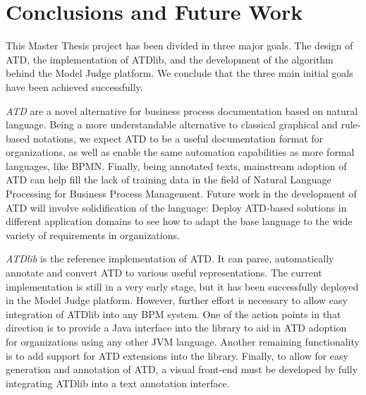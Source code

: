 \chapter{Conclusions and Future Work}
\label{cha:conclusions}

This Master Thesis project has been divided in three major goals. The design of
ATD, the implementation of ATDlib, and the development of the algorithm behind
the Model Judge platform. We conclude that the three main initial goals have
been achieved successfully.



\emph{ATD} are a novel alternative for business process documentation based on natural
language. Being a more understandable alternative to classical graphical and
rule-based notations, we expect ATD to be a useful documentation format for
organizations, as well as enable the same automation capabilities as more formal
languages, like BPMN. Finally, being annotated texts, mainstream adoption of ATD
can help fill the lack of training data in the field of Natural Language
Processing for Business Process Management. Future work in the development of
ATD will involve solidification of the language: Deploy ATD-based solutions in
different application domains to see how to adapt the base language to the wide
variety of requirements in organizations.



\emph{ATDlib} is the reference implementation of ATD. It can parse, automatically
annotate and convert ATD to various useful representations. The current
implementation is still in a very early stage, but it has been successfully
deployed in the Model Judge platform. However, further effort is necessary to
allow easy integration of ATDlib into any BPM system. One of the action points
in that direction is to provide a Java interface into the library to aid in ATD
adoption for organizations using any other JVM language. Another remaining
functionality is to add support for ATD extensions into the library. Finally,
to allow for easy generation and annotation of ATD, a visual front-end must be
developed by fully integrating ATDlib into a text annotation interface.

